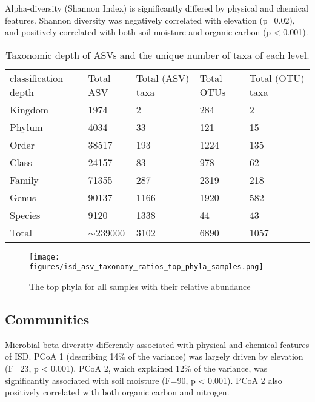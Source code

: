 Alpha-diversity (Shannon Index) is significantly differed by physical and chemical features.
Shannon diversity was negatively correlated with elevation (p=0.02), and
positively correlated with both soil moisture and organic carbon (p < 0.001).

\begin{table}[]
    \caption{Taxonomic depth of ASVs and the unique number of taxa of each level.\label{table:asv_taxonomy}}%
\begin{tabular}{@{}lllll@{}}
classification depth & Total ASV    & Total (ASV) taxa & Total OTUs & Total (OTU) taxa\\
Kingdom              & 1974         & 2                & 284        & 2               \\
Phylum               & 4034         & 33               & 121        & 15              \\
Order                & 38517        & 193              & 1224       & 135             \\
Class                & 24157        & 83               & 978        & 62              \\
Family               & 71355        & 287              & 2319       & 218             \\
Genus                & 90137        & 1166             & 1920       & 582             \\
Species              & 9120         & 1338             & 44         & 43              \\
Total                & $\sim$239000 & 3102             & 6890       & 1057            
\end{tabular}
\label{table:asv_taxonomy}
\end{table}

\begin{figure}[h]
      \centering
      \texttt{[image: figures/isd\_asv\_taxonomy\_ratios\_top\_phyla\_samples.png]}
      \caption[Top phyla of each samples]{The top phyla for all samples with their relative abundance}
      \label{fig:isd_top_phyla_samples}
\end{figure}
   

\subsection{Communities}\label{communities}
Microbial beta diversity differently associated with physical and chemical
features of ISD. PCoA 1 (describing 14\% of the variance) was largely driven by
elevation (F=23, p < 0.001). PCoA 2, which explained 12\% of the variance,
was significantly associated with soil moisture (F=90, p < 0.001).
PCoA 2 also positively correlated with both organic carbon and nitrogen.


